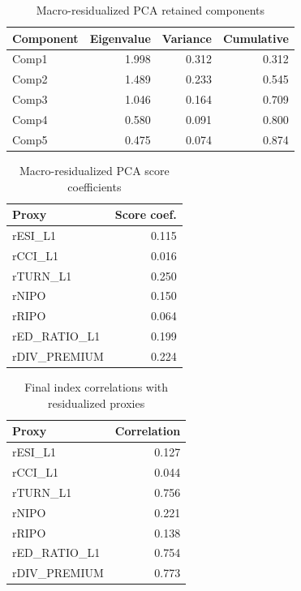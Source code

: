 \begin{table}[H]
\centering
\caption{Macro-residualized PCA retained components}
\label{tab:sentiment_pca_stage3_eigen}
\begin{tabular}{lrrr}
\toprule
Component & Eigenvalue & Variance & Cumulative \\
\midrule
Comp1 & 1.998 & 0.312 & 0.312 \\
Comp2 & 1.489 & 0.233 & 0.545 \\
Comp3 & 1.046 & 0.164 & 0.709 \\
Comp4 & 0.580 & 0.091 & 0.800 \\
Comp5 & 0.475 & 0.074 & 0.874 \\
\bottomrule
\end{tabular}
\end{table}

\begin{table}[H]
\centering
\caption{Macro-residualized PCA score coefficients}
\label{tab:sentiment_pca_stage3_coeff}
\begin{tabular}{lr}
\toprule
Proxy & Score coef. \\
\midrule
rESI\_L1 & 0.115 \\
rCCI\_L1 & 0.016 \\
rTURN\_L1 & 0.250 \\
rNIPO & 0.150 \\
rRIPO & 0.064 \\
rED\_RATIO\_L1 & 0.199 \\
rDIV\_PREMIUM & 0.224 \\
\bottomrule
\end{tabular}
\end{table}

\begin{table}[H]
\centering
\caption{Final index correlations with residualized proxies}
\label{tab:sentiment_pca_stage3_corr}
\begin{tabular}{lr}
\toprule
Proxy & Correlation \\
\midrule
rESI\_L1 & 0.127 \\
rCCI\_L1 & 0.044 \\
rTURN\_L1 & 0.756 \\
rNIPO & 0.221 \\
rRIPO & 0.138 \\
rED\_RATIO\_L1 & 0.754 \\
rDIV\_PREMIUM & 0.773 \\
\bottomrule
\end{tabular}
\end{table}
